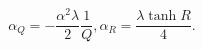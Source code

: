 \begin{equation}
\alpha_Q= -\frac{\alpha^2\lambda}{2}\frac{1}{Q}, \alpha_R=\frac{\lambda
\tanh R}{4}.
\end{equation}

